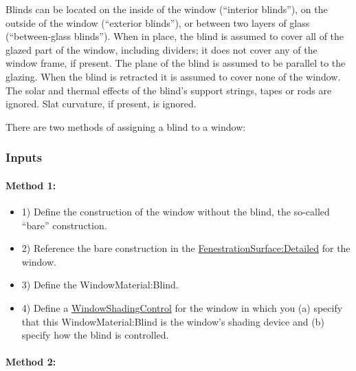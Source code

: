 Blinds can be located on the inside of the window (``interior blinds''), on the outside of the window (``exterior blinds''), or between two layers of glass (``between-glass blinds''). When in place, the blind is assumed to cover all of the glazed part of the window, including dividers; it does not cover any of the window frame, if present. The plane of the blind is assumed to be parallel to the glazing. When the blind is retracted it is assumed to cover none of the window. The solar and thermal effects of the blind's support strings, tapes or rods are ignored. Slat curvature, if present, is ignored.

There are two methods of assigning a blind to a window:

\subsubsection{Inputs}\label{inputs-23-005}

\paragraph{Method 1:}\label{method-1-1}
\begin{itemize}
\item 1) Define the construction of the window without the blind, the so-called ``bare'' construction.

\item 2) Reference the bare construction in the \hyperref[fenestrationsurfacedetailed]{FenestrationSurface:Detailed} for the window.

\item 3) Define the WindowMaterial:Blind.

\item 4) Define a \hyperref[windowpropertyshadingcontrol]{WindowShadingControl} for the window in which you (a) specify that this WindowMaterial:Blind is the window's shading device and (b) specify how the blind is controlled.

\end{itemize}

\paragraph{Method 2:}\label{method-2-1}

